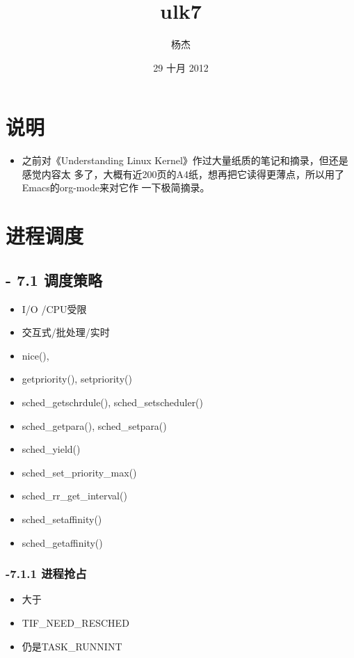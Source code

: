 \documentclass[11pt]{article}
\title{ulk7}
\author{杨杰}
\date{29 十月 2012}
\begin{document}
\maketitle

\setcounter{tocdepth}{3}
\tableofcontents
\vspace*{1cm}
\section{说明}
\label{sec-1}

\begin{itemize}
\item 之前对《Understanding Linux Kernel》作过大量纸质的笔记和摘录，但还是感觉内容太
  多了，大概有近200页的A4纸，想再把它读得更薄点，所以用了Emacs的org-mode来对它作
  一下极简摘录。
\end{itemize}
\section{进程调度}
\label{sec-2}

\subsection{- 7.1 调度策略}
\label{sec-2.1}

\begin{itemize}
\item I/O /CPU受限
\item 交互式/批处理/实时
\item nice(),
\item getpriority(), setpriority()
\item sched\_getschrdule(), sched\_setscheduler()
\item sched\_getpara(), sched\_setpara()
\item sched\_yield()
\item sched\_set\_priority\_max()
\item sched\_rr\_get\_interval()
\item sched\_setaffinity()
\item sched\_getaffinity()
\end{itemize}
\subsubsection{-7.1.1 进程抢占}
\label{sec-2.1.1}

\begin{itemize}
\item 大于
\item TIF\_NEED\_RESCHED
\item 仍是TASK\_RUNNINT
\end{itemize}
\end{document}
